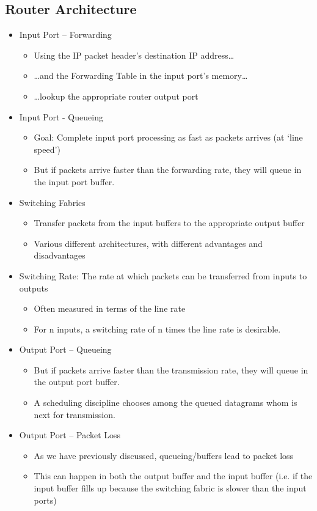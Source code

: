 \subsection{Router Architecture}
\begin{itemize}
  \item Input Port – Forwarding
    \begin{itemize}
      \item Using the IP packet header’s destination IP address…
      \item …and the Forwarding Table in the input port’s memory…
      \item …lookup the appropriate router output port
    \end{itemize}
  \item Input Port - Queueing
    \begin{itemize}
      \item Goal: Complete input port processing as fast as packets arrives (at ‘line speed’)
      \item But if packets arrive faster than the forwarding rate, they will queue in the input port buffer.
    \end{itemize}
  \item Switching Fabrics
    \begin{itemize}
      \item Transfer packets from the input buffers to the appropriate output buffer
      \item Various different architectures, with different advantages and disadvantages
    \end{itemize}
  \item Switching Rate: The rate at which packets can be transferred from inputs to outputs
    \begin{itemize}
      \item Often measured in terms of the line rate
      \item For n inputs, a switching rate of n times the line rate is desirable.
    \end{itemize}
  \item Output Port – Queueing
    \begin{itemize}
      \item But if packets arrive faster than the transmission rate, they will queue in the output port buffer.
      \item A scheduling discipline chooses among the queued datagrams whom is next for transmission.
    \end{itemize}
  \item Output Port – Packet Loss
    \begin{itemize}
      \item As we have previously discussed, queueing/buffers lead to packet loss
      \item This can happen in both the output buffer and the input buffer (i.e. if the input buffer fills up because the switching fabric is slower than the input ports)
    \end{itemize}
\end{itemize}

